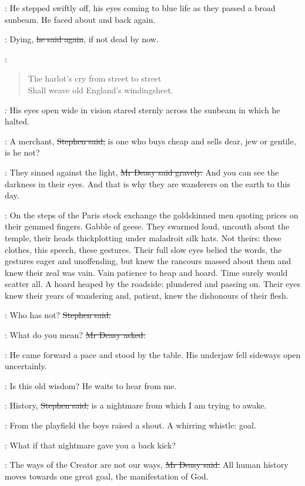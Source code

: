 :
He stepped swiftly off, his eyes coming to blue life
as they passed a broad sunbeam.
He faced about and back again.

\deasy:
Dying, \sout{he said again},
if not dead by now.

\StephenInt:
\begin{verse}
    The harlot's cry from street to street \\
    Shall weave old England's windingsheet.
\end{verse}

:
His eyes open wide in vision stared sternly across the sunbeam
in which he halted.

\Stephen:
A merchant, \sout{Stephen said,}
is one who buys cheap and sells dear,
jew or gentile,
is he not?

\deasy:
They sinned against the light,
\sout{Mr Deasy said gravely.}
And you can see the darkness in their eyes.
And that is why they are wanderers on the earth to this day.

\StephenInt:
On the steps of the Paris stock exchange
the goldskinned men quoting prices on their gemmed fingers.
Gabble of geese.
They swarmed loud, uncouth about the temple,
their heads thickplotting under maladroit silk hats.
Not theirs: these clothes, this speech, these gestures.
Their full slow eyes belied the words,
the gestures eager and unoffending,
but knew the rancours massed about them
and knew their zeal was vain.
Vain patience to heap and hoard.
Time surely would scatter all.
A hoard heaped by the roadside:
plundered and passing on.
Their eyes knew their years of wandering
and, patient, knew the dishonours of their flesh.

\Stephen:
Who has not?
\sout{Stephen said.}

\deasy:
What do you mean?
\sout{Mr Deasy asked.}

:
He came forward a pace and stood by the table.
His underjaw fell sideways open uncertainly.

\StephenInt:
Is this old wisdom?
He waits to hear from me.

\Stephen:
History, \sout{Stephen said,}
is a nightmare from which I am trying to awake.

:
From the playfield the boys raised a shout.
A whirring whistle: goal.

\StephenInt:
What if that nightmare gave you a back kick?

\deasy:
The ways of the Creator are not our ways,
\sout{Mr Deasy said.}
All human history moves towards one great goal,
the manifestation of God.

